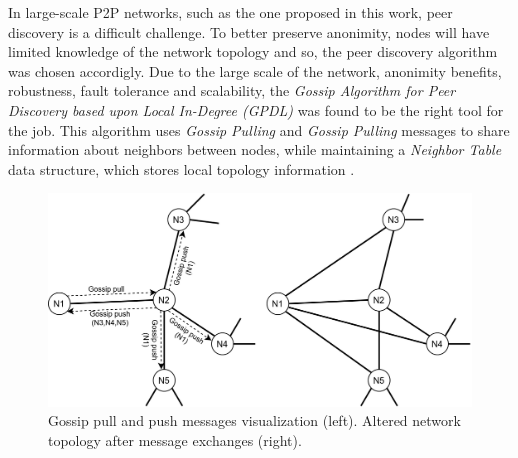 In large-scale P2P networks, such as the one proposed in this work, peer 
discovery is a difficult challenge. To better preserve anonimity, nodes will 
have limited knowledge of the network topology and so, the peer discovery 
algorithm was chosen accordigly. Due to the large scale of the network, 
anonimity benefits, robustness, fault tolerance and scalability, the 
\textit{Gossip Algorithm for Peer Discovery based upon Local In-Degree (GPDL)} 
was found to be the right tool for the job. This algorithm uses \textit{Gossip 
Pulling} and \textit{Gossip Pulling} messages to share information about 
neighbors between nodes, while maintaining a \textit{Neighbor Table} data 
structure, which stores local topology information \cite{peerdiscovery}.

\begin{figure}
    \centering
    \includegraphics[width=\textwidth]{figures/fig1}
    \caption{Gossip pull and push messages visualization (left). Altered 
network topology after message exchanges (right).}
    \label{fig:fig1}
\end{figure}

